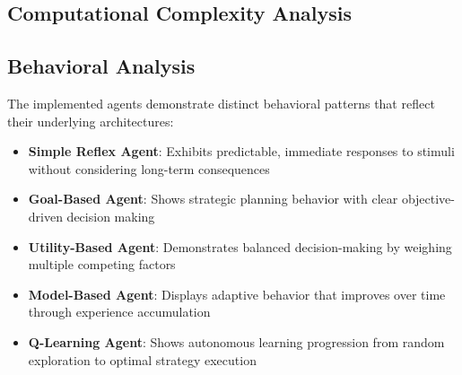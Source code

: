 \documentclass[11pt,a4paper]{article}
\begin{document}
\subsection{Computational Complexity Analysis}

\begin{table}[H]
\centering
\caption{Computational Complexity and Resource Requirements}
\end{table}

\subsection{Behavioral Analysis}

The implemented agents demonstrate distinct behavioral patterns that reflect their underlying architectures:

\begin{itemize}
\item \textbf{Simple Reflex Agent}: Exhibits predictable, immediate responses to stimuli without considering long-term consequences
\item \textbf{Goal-Based Agent}: Shows strategic planning behavior with clear objective-driven decision making
\item \textbf{Utility-Based Agent}: Demonstrates balanced decision-making by weighing multiple competing factors
\item \textbf{Model-Based Agent}: Displays adaptive behavior that improves over time through experience accumulation
\item \textbf{Q-Learning Agent}: Shows autonomous learning progression from random exploration to optimal strategy execution
\end{itemize}
\end{document}
